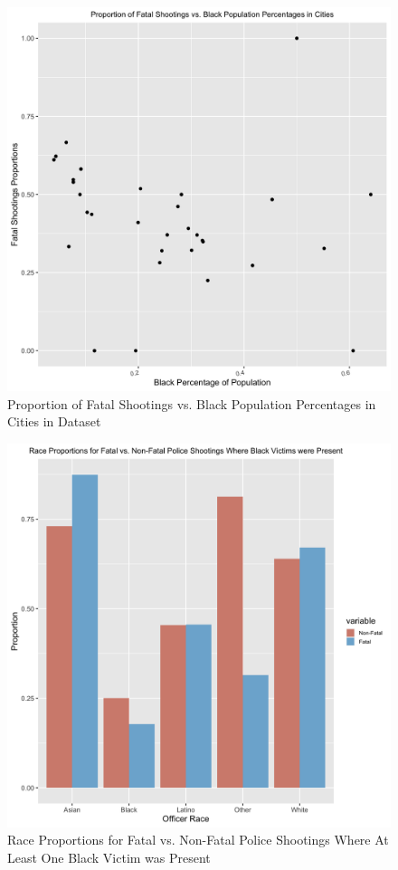 \documentclass[
]{article}
\begin{document}
\begin{figure}
\includegraphics[width=0.5\linewidth]{figures/bpropeda} \caption{Proportion of Fatal Shootings vs. Black Population Percentages in Cities in Dataset}\label{fig:figures-bprop}
\end{figure}

\begin{figure}
\includegraphics[width=0.5\linewidth]{figures/officerpropsb} \caption{Race Proportions for Fatal vs. Non-Fatal Police Shootings Where At Least One Black Victim was Present}\label{fig:figures-officersbprop}
\end{figure}
\end{document}
